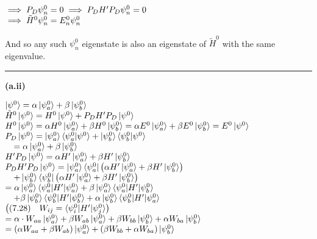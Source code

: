 \documentclass[14pt]{extarticle}
\makeatletter
\newenvironment{lefteqs}{%
    \begin{flushleft}%
    \renewcommand{\arraystretch}{1.3}%
    $\begin{array}{@{}l@{}}%
}{%
    \end{array}$%
    \end{flushleft}%
}
\makeatother
\begin{document}
\begin{lefteqs}
    \implies P_D \psi^0_n = 0 \implies P_D H' P_D \psi^0_n = 0 \\
    \implies \tilde{H}^0 \psi^0_n = E^0_n \psi^0_n
\end{lefteqs}

And so any such $\psi^0_n$ eigenstate is also an eigenstate of $\tilde{H}^0$ with the same eigenvalue.

\vspace{3em}
\hrule
\vspace{2em}

\textbf{(a.ii)}

\begin{lefteqs}
    \ket{\psi^0} = \alpha \ket{\psi^0_a} + \beta \ket{\psi^0_b} \\
    \tilde{H}^0 \ket{\psi^0} = H^0 \ket{\psi^0} + P_D H' P_D \ket{\psi^0} \\
    H^0 \ket{\psi^0} = \alpha H^0 \ket{\psi^0_a} + \beta H^0 \ket{\psi^0_b} = \alpha E^0 \ket{\psi^0_a} + \beta E^0 \ket{\psi^0_b} = E^0 \ket{\psi^0} \\
    P_D \ket{\psi^0} = \ket{\psi^0_a} \braket{\psi^0_a | \psi^0} + \ket{\psi^0_b} \braket{\psi^0_b | \psi^0} \\
    \quad = \alpha \ket{\psi^0_a} + \beta \ket{\psi^0_b} \\
    H' P_D \ket{\psi^0} = \alpha H' \ket{\psi^0_a} + \beta H' \ket{\psi^0_b} \\
    P_D H' P_D \ket{\psi^0} = \ket{\psi^0_a} \bra{\psi^0_a} \left( \alpha H' \ket{\psi^0_a} + \beta H' \ket{\psi^0_b} \right) \\
    \quad + \ket{\psi^0_b} \bra{\psi^0_b} \left( \alpha H' \ket{\psi^0_a} + \beta H' \ket{\psi^0_b} \right) \\
    = \alpha \ket{\psi^0_a} \braket{\psi^0_a | H' | \psi^0_a} + \beta \ket{\psi^0_a} \braket{\psi^0_a | H' | \psi^0_b} \\
    \quad + \beta \ket{\psi^0_b} \braket{\psi^0_b | H' | \psi^0_b} + \alpha \ket{\psi^0_b} \braket{\psi^0_b | H' | \psi^0_a} \\
    \left( \text{(7.28)} \quad W_{ij} = \braket{\psi^0_i | H' | \psi^0_j} \right) \\
    = \alpha \cdot W_{aa} \ket{\psi^0_a} + \beta W_{ab} \ket{\psi^0_a} + \beta W_{bb} \ket{\psi^0_b} + \alpha W_{ba} \ket{\psi^0_b} \\
    = \left( \alpha W_{aa} + \beta W_{ab} \right) \ket{\psi^0_a} + \left( \beta W_{bb} + \alpha W_{ba} \right) \ket{\psi^0_b}
\end{lefteqs}
\end{document}
